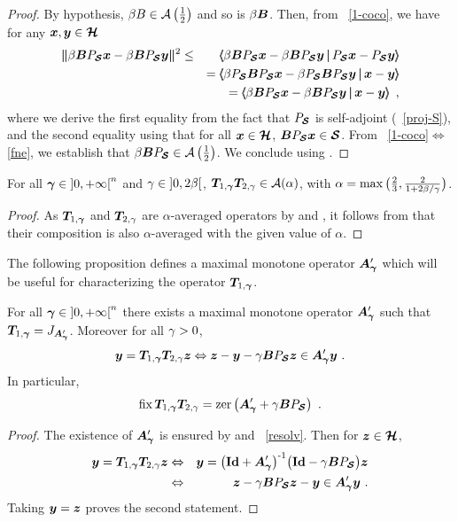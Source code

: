 \begin{proof}
By hypothesis, $\be B \in \Ademi$ and so is $\be\bB$. Then, from ~\ref{1-coco}, we have for any $\bx, \by \in \bHh$
\begin{eqnarray}
 \bnorm{\be \bBJ \bx - \be \bBJ \by}^2 & \leq & \bdprod{\be \bBJ \bx - \be \bBJ \by}{\PS \bx - \PS \by} \nonumber\\
  & & = \bdprod{\be \PS \bBJ \bx - \be \PS \bBJ \by}{\bx - \by} \nonumber\\
  & & = \bdprod{\be \bBJ \bx - \be \bBJ \by}{\bx - \by} ~,\label{eq:mono-cont}
\end{eqnarray} 
where we derive the first equality from the fact that $\PS$ is self-adjoint (~\ref{proj-S}), and the second equality using that for all $\bx \in \bHh$, $\bB \PS \bx \in \bSs$. From ~\ref{1-coco}$\Leftrightarrow$\ref{fne}, we establish that $\be \bBJ \in \Ademi$. We conclude using \cite[Lemma 2.3]{Combettes04}.
\end{proof}

\begin{proposition}
For all $\bga \in {]0,\pinfty[}^n$ and $\ga \in {]0,2\beta[}$, $\Tb\Tf \in \Aa(\al)$, with $\al = \max\bpa{\textfrac{2}{3},\textfrac{2}{1+2\be/\ga}}$.
\label{prop:TbTf}
\end{proposition}

\begin{proof}
As $\Tb$ and $\Tf$ are $\alpha$-averaged operators by  and , it follows from \cite[Lemma 2.2 (iii)]{Combettes04} that their composition is also $\alpha$-averaged with the given value of $\alpha$. 
\end{proof}

\medskip

\noindent The following proposition defines a maximal monotone operator $\Apga$ which will be useful for characterizing the operator $\Tb$.
\begin{proposition}\label{Ap-fix-zer}
For all $\bga \in {]0,\pinfty[}^n$ there exists a maximal monotone operator $\Apga$ such that $\Tb = J_{\Apga}$. Moreover for all $\ga > 0$,
%
\begin{equation}\label{incApB}
\by = \Tb\Tf\bz \Leftrightarrow \bz - \by -\ga \bBJ\bz \in \Apga \by ~.
\end{equation}
% 
In particular,
\[
\fix \Tb \Tf = \zer \pa{\Apga + \ga \bBJ }~.
\]
\end{proposition}
\begin{proof}
The existence of $\Apga$ is ensured by  and ~\ref{resolv}. Then for $\bz \in \bHh$,
\begin{eqnarray*}
 \by = \Tb \Tf \bz  & \Leftrightarrow & \by = \inv{\pa{\bId + \Apga}} \bpa{\bId - \ga \bBJ} \bz \\
                    & \Leftrightarrow &  \bz - \ga \bBJ\bz - \by \in \Apga\by ~.
\end{eqnarray*}
Taking $\by=\bz$ proves the second statement.
\end{proof}

